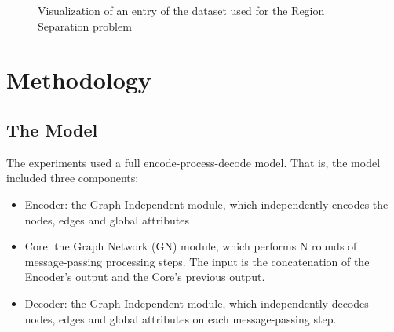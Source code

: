 \begin{figure}[H]
    \centering
    
    
    \caption{Visualization of an entry of the dataset used for the Region Separation problem}
    
    \label{fig:regions_separation_dataset_visualization}
\end{figure}


\section{Methodology}

\subsection{The Model}

The experiments used a full encode-process-decode model. That is, the model included three components:

\begin{itemize}

    \item Encoder: the Graph Independent module, which independently encodes the nodes, edges and global attributes
    
    \item Core: the Graph Network (GN) module, which performs N rounds of message-passing processing steps. The input is the concatenation of the Encoder’s output and the Core’s previous output.
    
    \item Decoder: the Graph Independent module, which independently decodes nodes, edges and global attributes on each message-passing step.

\end{itemize}

